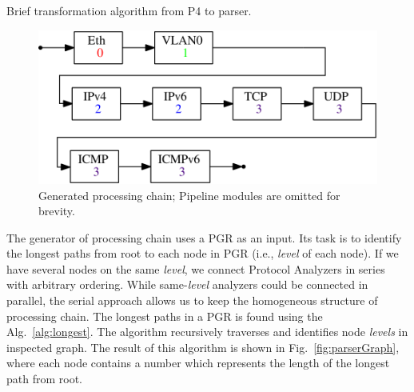 \begin{algorithm}[t]
    \caption{Brief transformation algorithm from P4 to parser.}
    \SetAlgoLined
    \label{alg:transformationParserAlg}
\end{algorithm}

\begin{figure}[b]
    \centering
    \includegraphics[scale=0.67]{chapters/pic/ParserPipeline}
    \caption{Generated processing chain; Pipeline modules are omitted for brevity.}
    \label{fig:parserPipeline}
\end{figure}

The generator of processing chain uses a PGR as an input. 
Its task is to identify the longest paths from root to each node in PGR (i.e., \textit{level} of each node). 
If we have several nodes on the same \textit{level}, we connect Protocol Analyzers in series with arbitrary ordering.
While same-\textit{level} analyzers could be connected in parallel, the serial approach allows us to keep the homogeneous structure of processing chain.
The longest paths in a PGR is found using the Alg.~\ref{alg:longest}. 
The algorithm recursively traverses and identifies node \textit{levels} in inspected graph.
The result of this algorithm is shown in Fig.~\ref{fig:parserGraph}, where each node contains a number which represents the length of the longest path 
from root. 

